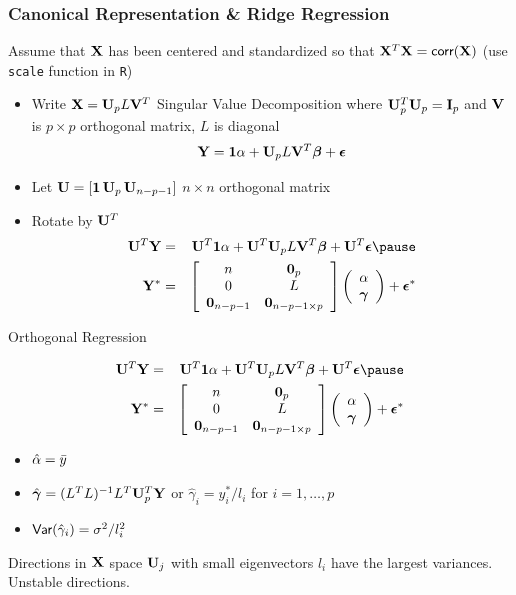 \documentclass[handout]{beamer}
\begin{document}
\begin{frame}
  \frametitle{Canonical Representation \& Ridge Regression}
  Assume that $\mathbf{X}$ has been centered and standardized so that $\mathbf{X}^T\mathbf{X}
  = \textsf{corr}(\mathbf{X})$ \pause  (use {\tt scale} function in {\tt R}) \pause

  \begin{itemize}
  \item Write $\mathbf{X} = \mathbf{U}_p L \mathbf{V}^T$ Singular Value Decomposition \pause where
    $\mathbf{U}_p^T\mathbf{U}_p = \mathbf{I}_p$ and $\mathbf{V}$ is $p \times p$ orthogonal matrix,
    $L$ is diagonal \pause 
  $$ \mathbf{Y} = \mathbf{1} \alpha +  \mathbf{U}_p L \mathbf{V}^T \boldsymbol{\beta} + \boldsymbol{\epsilon} $$ \pause
  \item  Let $\mathbf{U} = [\mathbf{1} \, \mathbf{U}_p \, \mathbf{U}_{n-p -1}]$ $n \times n$  orthogonal matrix \pause
\item Rotate by $\mathbf{U}^T$ \pause
  \begin{eqnarray*}
    \U^T \Y & = & \U^T \one \alpha + \U^T \U_p L \V^T \b + \U^T \eps \pause \\
    \Y^* 
   &=& \left[
  \begin{array}{cc}
   n & \zero_p\\ 0 & L \\  \zero_{n-p -1} & \zero_{n - p - 1  \times p} 
  \end{array}
 \right]
\left(    \begin{array}{c}
      \alpha \\
  \g
    \end{array} \right)
+  \eps^*
  \end{eqnarray*} \pause

  \end{itemize}
\end{frame}
  \begin{frame} {Orthogonal Regression}

  \begin{eqnarray*}
    \U^T \Y & = & \U^T \one \alpha + \U^T \U_p L \V^T \b + \U^T \eps \pause \\
    \Y^* 
   &=& \left[
  \begin{array}{cc}
   n & \zero_p\\ 0 & L \\  \zero_{n-p -1} & \zero_{n - p - 1  \times p} 
  \end{array}
 \right]
\left(    \begin{array}{c}
      \alpha \\
  \g
    \end{array} \right)
+  \eps^*
  \end{eqnarray*} \pause

    
  \begin{itemize}
  \item   $\hat{\alpha} = \bar{y}$ \pause 
\item $\hat{\boldsymbol{\gamma}} =( L^TL)^{-1} L^T \mathbf{U}^T_p\mathbf{Y}$ or $\hat{\gamma}_i = y^*_i/l_i$ for
  $i = 1, \ldots, p$ \pause
\item  $\textsf{Var}(\hat{\gamma}_i) = \sigma^2/l_i^2$
  \end{itemize}
Directions in $\mathbf{X}$ space $\mathbf{U}_j$ with small eigenvectors $l_i$ have
the largest variances.  Unstable directions.
\end{frame}
\end{document}
